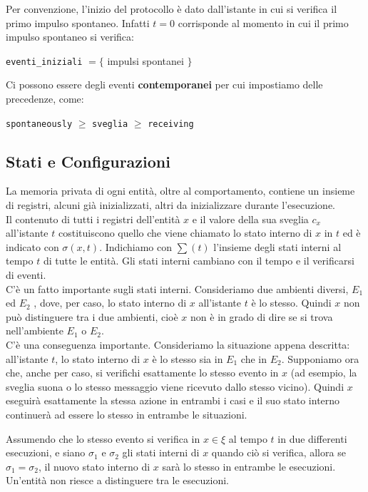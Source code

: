 Per convenzione, l'inizio del protocollo è dato dall'istante in cui si verifica
il primo impulso spontaneo. Infatti $t=0$ corrisponde al momento in cui il primo
impulso spontaneo si verifica:
\begin{center}
    \texttt{eventi\_iniziali} $=\lbrace$ impulsi spontanei $\rbrace$
\end{center}
Ci possono essere degli eventi \textbf{contemporanei} per cui impostiamo delle
precedenze, come:
\begin{center}
    \texttt{spontaneously} $\geq$ \texttt{sveglia} $\geq$ \texttt{receiving}
\end{center}

\subsection{Stati e Configurazioni}
La memoria privata di ogni entità, oltre al comportamento, contiene un insieme
di registri, alcuni già inizializzati, altri da inizializzare durante
l'esecuzione.\\
Il contenuto di tutti i registri dell'entità $x$ e il valore della sua sveglia
$c_x$ all'istante $t$ costituiscono quello che viene chiamato lo stato interno
di $x$ in $t$ ed è indicato con $\sigma (x, t)$. Indichiamo con $\sum(t)$
l'insieme degli stati interni al tempo $t$ di tutte le entità. Gli stati interni
cambiano con il tempo e il verificarsi di eventi.\\
C'è un fatto importante sugli stati interni. Consideriamo due ambienti diversi,
$E_1$ ed $E_2$ , dove, per caso, lo stato interno di $x$ all'istante $t$ è lo
stesso. Quindi $x$ non può distinguere tra i due ambienti, cioè $x$ non è in
grado di dire se si trova nell'ambiente $E_1$ o $E_2$.\\
C'è una conseguenza importante. Consideriamo la situazione appena descritta:
all'istante $t$, lo stato interno di $x$ è lo stesso sia in $E_1$ che in $E_2$.
Supponiamo ora che, anche per caso, si verifichi esattamente lo stesso evento in
$x$ (ad esempio, la sveglia suona o lo stesso messaggio viene ricevuto dallo
stesso vicino). Quindi $x$ eseguirà esattamente la stessa azione in entrambi i
casi e il suo stato interno continuerà ad essere lo stesso in entrambe le
situazioni.

\begin{prop}

    Assumendo che lo stesso evento si verifica in $x \in  \xi$
    al tempo $t$ in due differenti esecuzioni, e siano $\sigma_1$ e $\sigma_2$ gli
    stati interni di $x$ quando ciò si verifica, allora se $\sigma_1 = \sigma_2$,
    il nuovo stato interno di $x$ sarà lo stesso in entrambe le esecuzioni.\\
    Un'entità non riesce a distinguere tra le esecuzioni.
\end{prop}

